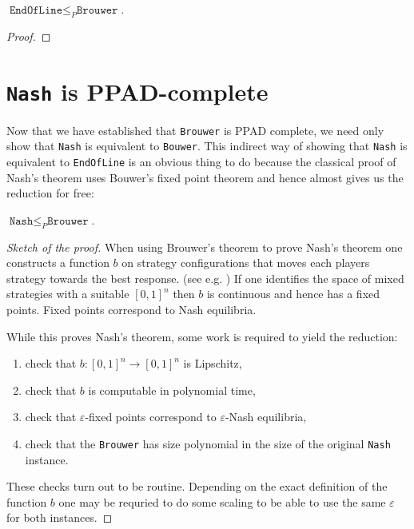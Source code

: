 \documentclass{article}
\begin{document}
\begin{theorem}
  $\texttt{EndOfLine}\leq_P\texttt{Brouwer}$.
  \begin{proof}
    \missingproof
  \end{proof}
\end{theorem}


\section{\texttt{Nash} is PPAD-complete}

Now that we have established that \texttt{Brouwer} is PPAD complete,
we need only show that \texttt{Nash} is equivalent to \texttt{Bouwer}.
This indirect way of showing that \texttt{Nash} is equivalent to
\texttt{EndOfLine} is an obvious thing to do because the classical
proof of Nash's theorem uses Bouwer's fixed point theorem and hence
almost gives us the reduction for free:

\begin{theorem}
  $\texttt{Nash}\leq_P\texttt{Brouwer}$.
  \begin{proof}[Sketch of the proof]
    When using Brouwer's theorem to prove Nash's theorem one
    constructs a function $b$ on strategy configurations that
    moves each players strategy towards the best response.
    (see e.g. \cite{karsten2017})
    If one identifies the space of mixed strategies with a suitable
    $\left[{0,1}\right]^n$ then $b$ is continuous and hence has a
    fixed points. Fixed points correspond to Nash equilibria.

    While this proves Nash's theorem, some work is required to
    yield the reduction:
    \begin{enumerate}
      \item check that $b:\left[{0,1}\right]^n\to\left[{0,1}\right]^n$
        is Lipschitz,
      \item check that $b$ is computable in polynomial time,
      \item check that $\varepsilon$-fixed points correspond to
        $\varepsilon$-Nash equilibria,
      \item check that the \texttt{Brouwer} has size polynomial
        in the size of the original \texttt{Nash} instance.
    \end{enumerate}
    These checks turn out to be routine. Depending on the exact
    definition of the function $b$ one may be requried to do some
    scaling to be able to use the same $\varepsilon$ for both
    instances.
  \end{proof}
\end{theorem}
\end{document}
